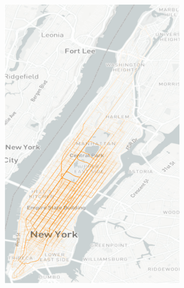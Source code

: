 \documentclass[12pt,notitlepage]{article}
\begin{document}
\begin{figure}[!p]
	\begin{subfigure}{0.32\linewidth}
		\includegraphics[width=\textwidth]{20210611-OSM/e_explore/trip_trajectories_ingraph/yellow_tripdata_2016-05.png}
		

\end{subfigure}
\end{figure}
\end{document}
